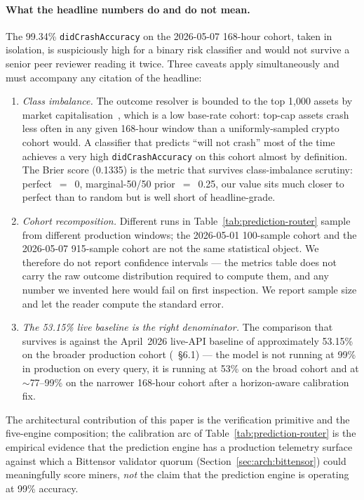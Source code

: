 \documentclass[11pt,a4paper]{article}
\begin{document}
\paragraph{What the headline numbers do and do not mean.} The 99.34\%
\texttt{didCrashAccuracy} on the 2026-05-07 168-hour cohort, taken in
isolation, is suspiciously high for a binary risk classifier and would not
survive a senior peer reviewer reading it twice. Three caveats apply
simultaneously and must accompany any citation of the headline:
\begin{enumerate}
  \item \emph{Class imbalance.} The outcome resolver is bounded to the top
        1{,}000 assets by market capitalisation~\cite{omnirisk2026systemdesign},
        which is a low base-rate cohort: top-cap assets crash less often in any
        given 168-hour window than a uniformly-sampled crypto cohort would. A
        classifier that predicts ``will not crash'' most of the time achieves a
        very high \texttt{didCrashAccuracy} on this cohort almost by definition.
        The Brier score (0.1335) is the metric that survives class-imbalance
        scrutiny: perfect~$=$~0, marginal-50/50 prior~$=$~0.25, our value sits
        much closer to perfect than to random but is well short of headline-grade.
  \item \emph{Cohort recomposition.} Different runs in
        Table~\ref{tab:prediction-router} sample from different production
        windows; the 2026-05-01 100-sample cohort and the 2026-05-07 915-sample
        cohort are not the same statistical object. We therefore do not report
        confidence intervals --- the metrics table does not carry the raw
        outcome distribution required to compute them, and any number we
        invented here would fail on first inspection. We report sample size
        and let the reader compute the standard error.
  \item \emph{The 53.15\% live baseline is the right denominator.} The
        comparison that survives is against the April~2026 live-API baseline
        of approximately 53.15\% on the broader production cohort
        (\cite{omnirisk2026systemdesign}~§6.1) --- the model is not running at
        99\% in production on every query, it is running at 53\% on the broad
        cohort and at $\sim$77--99\% on the narrower 168-hour cohort after a
        horizon-aware calibration fix.
\end{enumerate}
The architectural contribution of this paper is the verification primitive and
the five-engine composition; the calibration arc of
Table~\ref{tab:prediction-router} is the empirical evidence that the prediction
engine has a production telemetry surface against which a Bittensor validator
quorum (Section~\ref{sec:arch:bittensor}) could meaningfully score miners,
\emph{not} the claim that the prediction engine is operating at 99\% accuracy.
\end{document}
